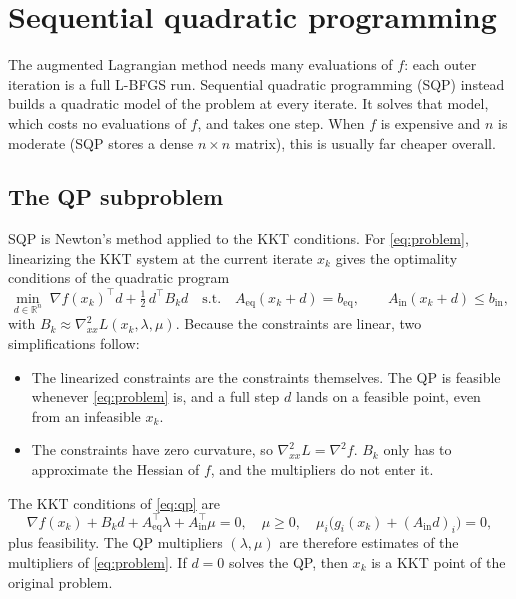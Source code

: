 \documentclass[11pt,a4paper]{article}
\newcommand{\R}{\mathbb{R}}
\newcommand{\Aeq}{A_{\mathrm{eq}}}
\newcommand{\beq}{b_{\mathrm{eq}}}
\newcommand{\Ain}{A_{\mathrm{in}}}
\newcommand{\bin}{b_{\mathrm{in}}}
\begin{document}
\section{Sequential quadratic programming}\label{sec:sqp}

The augmented Lagrangian method needs many evaluations of $f$: each outer
iteration is a full L-BFGS run. Sequential quadratic programming (SQP)
instead builds a quadratic model of the problem at every iterate. It solves
that model, which costs no evaluations of $f$, and takes one step. When $f$
is expensive and $n$ is moderate (SQP stores a dense $n\times n$ matrix),
this is usually far cheaper overall.

\subsection{The QP subproblem}
SQP is Newton's method applied to the KKT conditions. For
\eqref{eq:problem}, linearizing the KKT system at the current iterate $x_k$
gives the optimality conditions of the quadratic program
\begin{equation}\label{eq:qp}
  \min_{d\in\R^n}\; \nabla f(x_k)^\top d + \tfrac12\, d^\top B_k d
  \quad\text{s.t.}\quad
  \Aeq(x_k+d) = \beq,\qquad \Ain(x_k+d)\le\bin,
\end{equation}
with $B_k\approx\nabla^2_{xx}L(x_k,\lambda,\mu)$. Because the constraints are
linear, two simplifications follow:
\begin{itemize}
  \item The linearized constraints are the constraints themselves. The QP is
        feasible whenever \eqref{eq:problem} is, and a full step $d$ lands
        on a feasible point, even from an infeasible $x_k$.
  \item The constraints have zero curvature, so
        $\nabla^2_{xx}L=\nabla^2 f$. $B_k$ only has to approximate the
        Hessian of $f$, and the multipliers do not enter it.
\end{itemize}
The KKT conditions of \eqref{eq:qp} are
\[
  \nabla f(x_k) + B_k d + \Aeq^\top\lambda + \Ain^\top\mu = 0,\quad
  \mu\ge 0,\quad \mu_i\big(g_i(x_k)+(\Ain d)_i\big)=0,
\]
plus feasibility. The QP multipliers $(\lambda,\mu)$ are therefore estimates of
the multipliers of \eqref{eq:problem}. If $d=0$ solves the QP, then $x_k$ is
a KKT point of the original problem.
\end{document}
